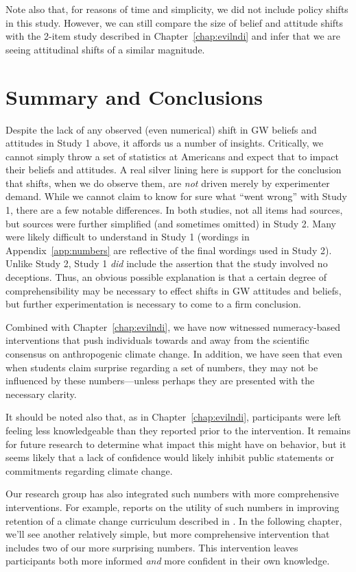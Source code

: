 Note also that, for reasons of time and simplicity, we did not include policy
shifts in this study. However, we can still compare the size of belief and
attitude shifts with the 2-item study described in Chapter~\ref{chap:evilndi}
and infer that we are seeing attitudinal shifts of a similar magnitude.

\section{Summary and Conclusions}

Despite the lack of any observed (even numerical) shift in GW beliefs and
attitudes in Study 1 above, it affords us a number of insights.
Critically, we cannot simply throw a set of statistics at Americans and expect that
to impact their beliefs and attitudes. A real silver lining here is support for
the conclusion that shifts, when we do observe them, are \emph{not} driven
merely by experimenter demand. While we cannot claim to know for sure what “went
wrong” with Study 1, there are a few notable differences.  In both studies, not
all items had sources, but sources were further simplified (and sometimes
omitted) in Study 2. Many were likely difficult to understand in Study 1
(wordings in Appendix~\ref{app:numbers} are reflective of the final wordings
used in Study 2). Unlike Study 2, Study 1 \emph{did} include the assertion that
the study involved no deceptions. Thus, an obvious possible explanation is that a
certain degree of comprehensibility may be necessary to effect shifts in GW
attitudes and beliefs, but further experimentation is necessary to come to a firm
conclusion.

Combined with Chapter~\ref{chap:evilndi}, we have now witnessed numeracy-based
interventions that push individuals towards and away from the scientific
consensus on anthropogenic climate change. In addition, we have seen that even
when students claim surprise regarding a set of numbers, they may not be
influenced by these numbers---unless perhaps they are presented with the
necessary clarity.

It should be noted also that, as in Chapter~\ref{chap:evilndi}, participants were
left feeling less knowledgeable than they reported prior to the intervention. It
remains for future research to determine what impact this might have on
behavior, but it seems likely that a lack of confidence would likely
inhibit public statements or commitments regarding climate change.

Our research group has also integrated such numbers with  more comprehensive
interventions. For example, \textcite{clark_knowledge_inpress} reports on the
utility of such numbers in improving retention of a climate change curriculum
described in \textcite{felipe_numerical_2012}. In the following chapter, we'll
see another relatively simple, but more comprehensive intervention that includes two
of our more surprising numbers. This intervention leaves participants both more informed
\emph{and} more confident in their own knowledge.

